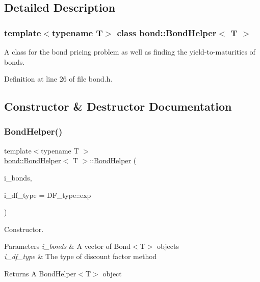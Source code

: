 \subsection{Detailed Description}
\subsubsection*{template$<$typename T$>$\newline
class bond\+::\+Bond\+Helper$<$ T $>$}

A class for the bond pricing problem as well as finding the yield-\/to-\/maturities of bonds. 

Definition at line 26 of file bond.\+h.



\subsection{Constructor \& Destructor Documentation}
\mbox{\label{classbond_1_1_bond_helper_aa86a95eaffb5a36c0ec52376b28d5d96}} 
\subsubsection{\texorpdfstring{Bond\+Helper()}{BondHelper()}}
{\footnotesize\ttfamily template$<$typename T $>$ \\
\hyperlink{classbond_1_1_bond_helper}{bond\+::\+Bond\+Helper}$<$ T $>$\+::\hyperlink{classbond_1_1_bond_helper}{Bond\+Helper} (\begin{DoxyParamCaption}\item[{const std\+::vector$<$ \hyperlink{classbond_1_1_bond}{Bond}$<$ T $>$$>$ \&}]{i\+\_\+bonds,  }\item[{const \hyperlink{namespaceutilities_ad4290e607d0651ce53db6e5c776aca7c}{D\+F\+\_\+type} \&}]{i\+\_\+df\+\_\+type = {\ttfamily DF\+\_\+type\+:\+:exp} }\end{DoxyParamCaption})\hspace{0.3cm}{\ttfamily [inline]}}



Constructor. 


\begin{DoxyParams}{Parameters}
{\em i\+\_\+bonds} & A vector of Bond$<$\+T$>$ objects \\
\hline
{\em i\+\_\+df\+\_\+type} & The type of discount factor method \\
\hline
\end{DoxyParams}
\begin{DoxyReturn}{Returns}
A Bond\+Helper$<$\+T$>$ object 
\end{DoxyReturn}


